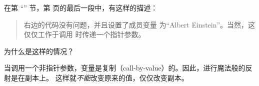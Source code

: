 \begin{Exercise}[title={指针和反射},difficulty=1]
\label{ex:pointers and reflection}
\Question
在第 ``'' 节，第 \pageref{sec:introspection and reflection} 
页的最后一段中，有这样的描述：
\begin{quote}
右边的代码没有问题，并且设置了成员变量  
为``Albert Einstein''。当然，这仅仅工作于调用  时传递一个指针参数。
\end{quote}
为什么是这样的情况？
\end{Exercise}

\begin{Answer}
\Question
当调用一个非指针参数，变量是复制（call-by-value）的。因此，进行魔法般的反射是在副本上。
这样就\emph{不能}改变原来的值，仅仅改变副本。
\end{Answer}
